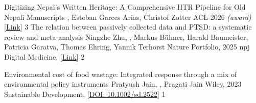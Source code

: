 
\begin{publications}
\publication
    {Digitizing Nepal’s Written Heritage: A Comprehensive HTR Pipeline for Old Nepali Manuscripts}{}
    {\underline{}, Esteban Garces Arias, Christof Zotter}
	{ACL 2026 \textit{(award)}} {[\href{https://aclanthology.org/2026.acl-long.671/}{Link}]} {3}
    \publication
    {The relation between passively collected data and PTSD: a systematic review and meta-analysis}{}
    {Ningzhe Zhu, \underline{}, Markus Bühner, Harald Baumeister, Patricia Garatva, Thomas Ehring, Yannik Terhorst}
	{Nature Portfolio, 2025} {npj Digital Medicine, [\href{https://doi.org/10.1038/s41746-025-01825-6}{Link}]} {2}

\end{publications}
\begin{publications}

    \publication
    {Environmental cost of food wastage: Integrated response through a mix of environmental policy instruments}{}
    {Pratyush Jain, \underline{}, Pragati Jain}
	{Wiley, 2023} {Sustainable Development, [\href{https://doi.org/10.1002/sd.2522}{DOI: 10.1002/sd.2522}]} {1}

\end{publications}

\vspace{-3mm}
